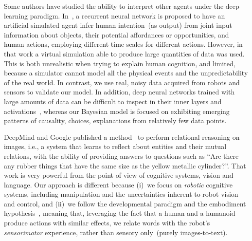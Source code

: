 Some authors have studied the ability to interpret other agents under the deep learning paradigm.
In~\cite{kim:2017:nn}, a recurrent neural network is proposed to have an artificial simulated agent infer human intention~(as output) from joint input information about objects, their potential affordances or opportunities, and human actions, employing different time scales for different actions.
However, in that work a virtual simulation able to produce large quantities of data was used.
This is both unrealistic when trying to explain human cognition, and limited, because a simulator cannot model all the physical events and the unpredictability of the real world.
In contrast, we use real, noisy data acquired from robots and sensors to validate our model.
In addition, deep neural networks trained with large amounts of data can be difficult to inspect in their inner layers and activations~\cite{szegedy:2014:intriguing}, whereas our Bayesian model is focused on exhibiting emerging patterns of causality, choices, explanations from relatively few data points.

DeepMind and Google published a method~\cite{santoro:2017:relational_reasoning} to perform relational reasoning on images, i.e., a system that learns to reflect about entities and their mutual relations, with the ability of providing answers to questions such as ``Are there any rubber things that have the same size as the yellow metallic cylinder?''.
That work is very powerful from the point of view of cognitive systems, vision and language.
Our approach is different because (i)~we focus on \emph{robotic} cognitive systems, including manipulation and the uncertainties inherent to robot vision and control, and (ii)~we follow the developmental paradigm and the embodiment hypothesis~\cite{lungarella:2003:devrobsurvey}, meaning that, leveraging the fact that a human and a humanoid produce actions with similar effects, we relate words with the robot's \emph{sensorimotor} experience, rather than sensory only~(purely images-to-text).

